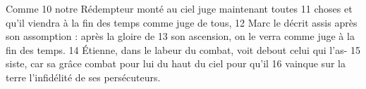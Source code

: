 Comme	 
10	 	notre Rédempteur monté au ciel juge maintenant toutes	 
11	 	choses et qu'il viendra à la fin des temps comme juge de tous,	 
12	 	Marc le décrit assis après son assomption : après la gloire de	 
13	 	son ascension, on le verra comme juge à la fin des temps.	 
14	 	Étienne, dans le labeur du combat, voit debout celui qui l'as-	 
15	 	siste, car sa grâce combat pour lui du haut du ciel pour qu'il	 
16	 	vainque sur la terre l'infidélité de ses persécuteurs.